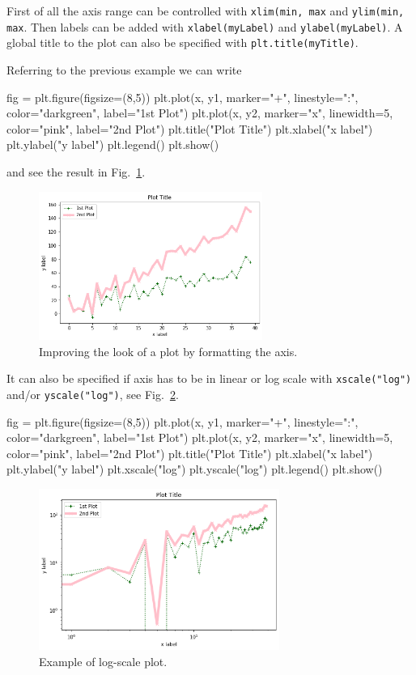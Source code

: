 \begin{ipython}
First of all the axis range can be controlled with
\texttt{xlim(min, max} and \texttt{ylim(min, max}. Then labels can be
added with \texttt{xlabel(myLabel)} and \texttt{ylabel(myLabel)}. A
global title to the plot can also be specified with
\texttt{plt.title(myTitle)}.

Referring to the previous example we can write

\begin{ipython}
fig = plt.figure(figsize=(8,5))
plt.plot(x, y1, marker="+", linestyle=":", color="darkgreen", label="1st Plot")
plt.plot(x, y2, marker="x", linewidth=5, color="pink", label="2nd Plot")
plt.title("Plot Title")
plt.xlabel("x label")
plt.ylabel("y label")
plt.legend()
plt.show()
\end{ipython}
\noindent
and see the result in Fig.~\ref{fig:axis1}.

\begin{figure}[htb]
	\centering
	\includegraphics[width=0.65\textwidth]{figures/axis1}
	\caption{Improving the look of a plot by formatting the axis.}
	\label{fig:axis1}
\end{figure}

It can also be specified if axis has to be in linear or log scale with
\texttt{xscale("log")} and/or \texttt{yscale("log")}, see Fig.~\ref{fig:axis2}.

\begin{ipython}
fig = plt.figure(figsize=(8,5))
plt.plot(x, y1, marker="+", linestyle=":", color="darkgreen", label="1st Plot")
plt.plot(x, y2, marker="x", linewidth=5, color="pink", label="2nd Plot")
plt.title("Plot Title")
plt.xlabel("x label")
plt.ylabel("y label")
plt.xscale("log")
plt.yscale("log")
plt.legend()
plt.show()
\end{ipython}

\begin{figure}[htb]
	\centering
	\includegraphics[width=0.7\textwidth]{figures/axis2}
	\caption{Example of log-scale plot.}
	\label{fig:axis2}
\end{figure}


\end{ipython}
